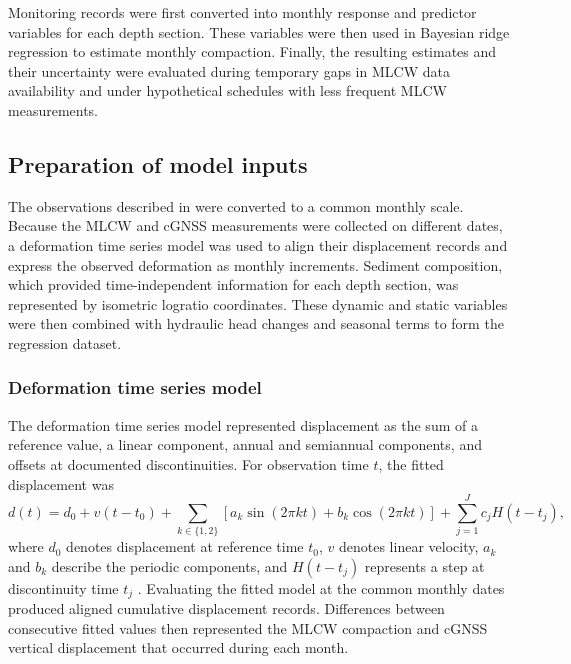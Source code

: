 Monitoring records were first converted into monthly response and predictor variables for each depth section. These variables were then used in Bayesian ridge regression to estimate monthly compaction. Finally, the resulting estimates and their uncertainty were evaluated during temporary gaps in MLCW data availability and under hypothetical schedules with less frequent MLCW measurements.

\subsection{Preparation of model inputs}
\label{subsec:predictor_preparation}

The observations described in  were converted to a common monthly scale. Because the MLCW and cGNSS measurements were collected on different dates, a deformation time series model was used to align their displacement records and express the observed deformation as monthly increments. Sediment composition, which provided time-independent information for each depth section, was represented by isometric logratio coordinates. These dynamic and static variables were then combined with hydraulic head changes and seasonal terms to form the regression dataset.

\subsubsection{Deformation time series model}
\label{subsec:deformation_model}

The deformation time series model represented displacement as the sum of a reference value, a linear component, annual and semiannual components, and offsets at documented discontinuities. For observation time $t$, the fitted displacement was
\begin{equation}
d(t)=d_0+v(t-t_0)
+\sum_{k\in\{1,2\}}
\left[a_k\sin(2\pi k t)+b_k\cos(2\pi k t)\right]
+\sum_{j=1}^{J}c_j H(t-t_j),
\label{eq:deformation_model}
\end{equation}
where $d_0$ denotes displacement at reference time $t_0$, $v$ denotes linear velocity, $a_k$ and $b_k$ describe the periodic components, and $H(t-t_j)$ represents a step at discontinuity time $t_j$ \citep{nikolaidis_observation_2002}. Evaluating the fitted model at the common monthly dates produced aligned cumulative displacement records. Differences between consecutive fitted values then represented the MLCW compaction and cGNSS vertical displacement that occurred during each month.

